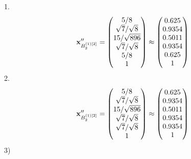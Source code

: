 \documentclass[10pt,a4paper]{article}
\begin{document}
	1.
	\[
		\bold{x}''_{B_2^{(1)[2]}} = 
		\begin{pmatrix}
			{{5}} / {{8}} \\
			{\sqrt{7}} / {\sqrt{8}} \\
			{{15}} / {\sqrt{896}} \\
			{\sqrt{7}} / {\sqrt{8}} \\
			{{5}} / {{8}} \\
			{1}{} \\
		\end{pmatrix}
		\approx
		\begin{pmatrix}
			0.625    \\
			0.9354   \\
			0.5011   \\
			0.9354   \\
			0.625    \\
			1        \\
		\end{pmatrix}
	\]
	2.
	\[
		\bold{x}''_{B_2^{(1)[2]}} = 
		\begin{pmatrix}
			{{5}} / {{8}} \\
			{\sqrt{7}} / {\sqrt{8}} \\
			{{15}} / {\sqrt{896}} \\
			{\sqrt{7}} / {\sqrt{8}} \\
			{\sqrt{7}} / {\sqrt{8}} \\
			{1}{} \\
		\end{pmatrix}
		\approx
		\begin{pmatrix}
			0.625    \\
			0.9354   \\
			0.5011   \\
			0.9354   \\
			0.9354   \\
			1        \\
		\end{pmatrix}
	\]
	3)
\end{document}
